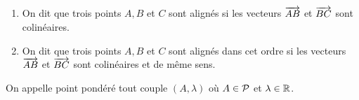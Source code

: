 \begin{defdef}
  \begin{enumerate}
    \item On dit que trois points $A, B$ et $C$ sont alignés si les vecteurs 
      $\vect{AB}$ et $\vect{BC}$ sont colinéaires.
    \item On dit que trois points $A, B$ et $C$ sont alignés dans cet ordre si 
      les vecteurs $\vect{AB}$ et $\vect{BC}$ sont colinéaires et de même sens.
  \end{enumerate}
\end{defdef}

\begin{defdef}
  On appelle point pondéré tout couple $(A,\lambda)$ où $A \in \P$ et $\lambda 
  \in \R$.
\end{defdef}

